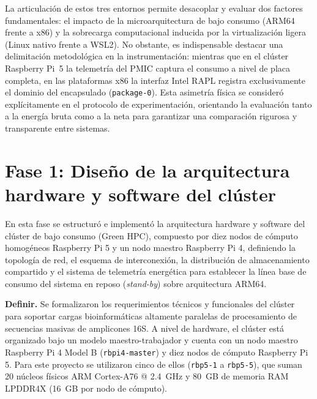 \documentclass[12pt,oneside,spanish]{book}
\begin{document}
    La articulación de estos tres entornos permite desacoplar y evaluar dos factores fundamentales: el impacto de la microarquitectura de bajo consumo (ARM64 frente a x86) y la sobrecarga computacional inducida por la virtualización ligera (Linux nativo frente a WSL2). No obstante, es indispensable destacar una delimitación metodológica en la instrumentación: mientras que en el clúster Raspberry Pi~5 la telemetría del PMIC captura el consumo a nivel de placa completa, en las plataformas x86 la interfaz Intel RAPL registra exclusivamente el dominio del encapsulado (\texttt{package-0}). Esta asimetría física se consideró explícitamente en el protocolo de experimentación, orientando la evaluación tanto a la energía bruta como a la neta para garantizar una comparación rigurosa y transparente entre sistemas.

    
    
    
    
    \section{Fase 1: Diseño de la arquitectura hardware y software del clúster}
    \label{sec:fase1_metodologia}
    
    En esta fase se estructuró e implementó la arquitectura hardware y software del clúster de bajo consumo (Green HPC), compuesto por diez nodos de cómputo homogéneos Raspberry Pi 5 y un nodo maestro Raspberry Pi 4, definiendo la topología de red, el esquema de interconexión, la distribución de almacenamiento compartido y el sistema de telemetría energética para establecer la línea base de consumo del sistema en reposo (\textit{stand-by}) sobre arquitectura ARM64.
    
    \textbf{Definir.} Se formalizaron los requerimientos técnicos y funcionales del clúster para soportar cargas bioinformáticas altamente paralelas de procesamiento de secuencias masivas de amplicones 16S. A nivel de hardware, el clúster está organizado bajo un modelo maestro-trabajador y cuenta con un nodo maestro Raspberry Pi 4 Model B (\texttt{rbpi4-master}) y diez nodos de cómputo Raspberry Pi 5. Para este proyecto se utilizaron cinco de ellos (\texttt{rbp5-1} a \texttt{rbp5-5}), que suman 20 núcleos físicos ARM Cortex-A76 @ 2.4~GHz y 80~GB de memoria RAM LPDDR4X (16~GB por nodo de cómputo).
    
\end{document}
